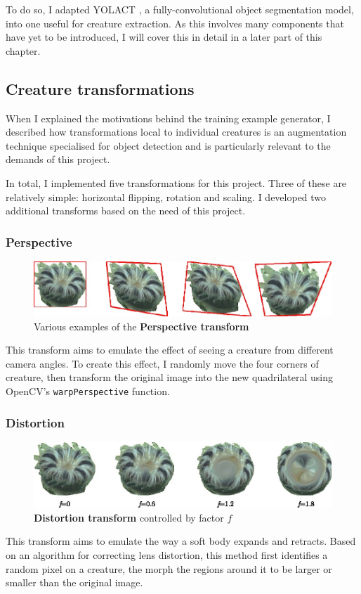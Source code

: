 \documentclass[12pt,a4paper,twoside,openany]{report}
\begin{document}
To do so, I adapted YOLACT \cite{bolya_yolact_2019}, a fully-convolutional object segmentation model, into one useful for creature extraction. As this involves many components that have yet to be introduced, I will cover this in detail in a later part of this chapter.

\subsection{Creature transformations}
When I explained the motivations behind the training example generator, I described how transformations local to individual creatures is an augmentation technique specialised for object detection and is particularly relevant to the demands of this project. 

In total, I implemented five transformations for this project. Three of these are relatively simple: horizontal flipping, rotation and scaling. I developed two additional transforms based on the need of this project.

\subsubsection{Perspective}
\begin{figure}[h]
    \centering
    \includegraphics[width=140mm]{figs/implementation/ct/perspect.jpg}
    \caption{Various examples of the \textbf{Perspective transform}}
    \label{fig:ct_flip}
\end{figure}
\noindent This transform aims to emulate the effect of seeing a creature from different camera angles. To create this effect, I randomly move the four corners of creature, then transform the original image into the new quadrilateral using OpenCV's \verb|warpPerspective| function.

\subsubsection{Distortion}
\begin{figure}[h]
    \centering
    \includegraphics[width=140mm]{figs/implementation/ct/distort.jpg}
    \caption{\textbf{Distortion transform} controlled by factor $f$}
    \label{fig:ct_flip}
\end{figure}
\noindent This transform aims to emulate the way a soft body expands and retracts. Based on an algorithm for correcting lens distortion, this method first identifies a random pixel on a creature, the morph the regions around it to be larger or smaller than the original image. 
\end{document}
